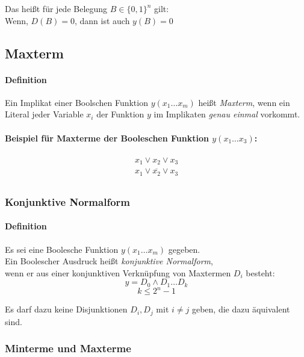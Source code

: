 \documentclass[a4paper]{scrartcl}
\begin{document}
			Das heißt für jede Belegung \( B \in \{0, 1\}^n \) gilt:\\
			Wenn, \( D(B) = 0 \), dann ist auch \( y(B) =0 \)
			
			\subsection{Maxterm}
			\paragraph{Definition}
			Ein Implikat einer Boolschen Funktion \( y( x_1 \dots x_m) \) heißt \emph{Maxterm}, wenn ein Literal jeder Variable \(x_i\) der Funktion \(y\) im Implikaten \emph{genau einmal} vorkommt.
			
			\paragraph{Beispiel für Maxterme der Booleschen Funktion \( y(x_1 \dots x_3) \):}
			\begin{align*}
				x_1 \vee x_2 \vee x_3 \\
				x_1 \vee \overline{x_2} \vee x_3 \\
			\end{align*} 
			
			\subsubsection{Konjunktive Normalform}
			\paragraph{Definition}
			Es sei eine Boolesche Funktion \( y( x_1 \dots x_m) \) gegeben.\\
			Ein Boolescher Ausdruck heißt \emph{konjunktive Normalform},\\
			wenn er aus einer konjunktiven Verknüpfung von Maxtermen \(D_i\) besteht:
			\[y = D_0 \wedge D_1 \dots D_k \]
			\[k \leq 2^n -1 \]
			
			Es darf dazu keine Disjunktionen \(D_i, D_j\) mit \( i \neq j \) geben, die dazu äquivalent sind.
			
			\subsubsection{Minterme und Maxterme}
\end{document}
